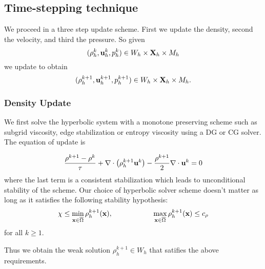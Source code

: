 \documentclass[letterpaper]{erdc}
\begin{document}
%
%
\subsection{Time-stepping technique}
We proceed in a three step update scheme.  First we update the density,  second the velocity, and third the pressure.  So given
\begin{equation}(\rho^{k}_h, \textbf{u}^{k}_{h}, p^{k}_h) \in W_h\times\textbf{X}_h\times M_h  \end{equation}
we update to obtain
\begin{equation}(\rho^{k+1}_h, \textbf{u}^{k+1}_{h}, p^{k+1}_h) \in W_h\times\textbf{X}_h\times M_h.\end{equation}

%
\subsubsection{Density Update}

We first solve the hyperbolic system with a monotone preserving scheme such as subgrid viscosity, edge stabilization or entropy viscosity using a DG or CG solver.  The equation of update is

\begin{equation}
  \frac{\rho^{k+1} - \rho^k}{\tau} + \nabla\cdot\left(\rho_h^{k+1}\textbf{u}^{k} \right) - \frac{\rho^{k+1}}{2}\nabla\cdot\textbf{u}^{k} = 0
\end{equation}
where the last term is a consistent stabilization which leads to unconditional stability of the scheme.   Our choice of hyperbolic solver scheme doesn't matter as long as it satisfies the following stability hypothesis:
\begin{equation}
  \chi \leq \displaystyle\min_{\textbf{x}\in\overline{\Omega}} \rho_h^{k+1}(\textbf{x}), \hspace{2cm} \displaystyle\max_{\textbf{x}\in\overline{\Omega}} \rho_{h}^{k+1}(\textbf{x}) \leq c_{\rho}
\end{equation}
for all $k\geq 1$.

Thus we obtain the weak solution $\rho_h^{k+1}\in W_h$ that satifies the above requirements.

%
\end{document}
